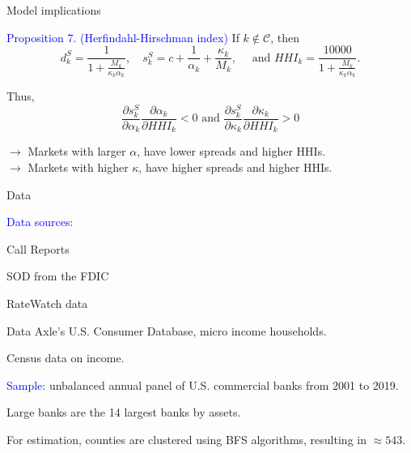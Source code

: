 \documentclass[notes,10pt, aspectratio=169]{beamer}
\newenvironment{wideitemize}{\itemize\addtolength{\itemsep}{10pt}}{\enditemize}
\begin{document}
    \begin{frame}{Model implications}

        \begin{wideitemize}
    
            \item \textcolor{blue}{Proposition 7. (Herfindahl-Hirschman index)} If $k \notin \mathcal{C}$, then
            $$
 d_k^S=\frac{1}{1+\frac{M_k}{\kappa_k \alpha_k}}, \quad s_k^S=c+\frac{1}{\alpha_k}+\frac{\kappa_k}{M_k}, \quad \text { and } H H I_k=\frac{10000}{1+\frac{M_k}{\kappa_k \alpha_k}} .
            $$
            \item Thus,
            $$
            \frac{\partial s_k^S}{\partial \alpha_k} \frac{\partial \alpha_k}{\partial H H I_k}<0 \text { and } \frac{\partial s_k^S}{\partial \kappa_k} \frac{\partial \kappa_k}{\partial H H I_k}>0
            $$

  $\rightarrow$ Markets with larger $\alpha$, have lower spreads and higher HHIs. \\
    $\rightarrow$ Markets with higher $\kappa$, have higher spreads and higher HHIs.

        \end{wideitemize}
        \end{frame}

\begin{frame}{Data}
    
    \begin{wideitemize}
        \item \textcolor{blue}{Data sources:}
        \vspace{0.2cm}
          \begin{wideitemize}
            \item Call Reports
            \item SOD from the FDIC
            \item RateWatch data
            \item Data Axle's U.S. Consumer Database, micro income households. 
            \item Census data on income.
           
            \end{wideitemize}

        \item \textcolor{blue}{Sample:} unbalanced annual panel of U.S. commercial banks from 2001 to 2019.
        
        \item Large banks are the 14 largest banks by assets.
        
        \item For estimation, counties are clustered using BFS algorithms, resulting in $\approx 543$. 
    \end{wideitemize}
    
\end{frame}
    
\end{document}
